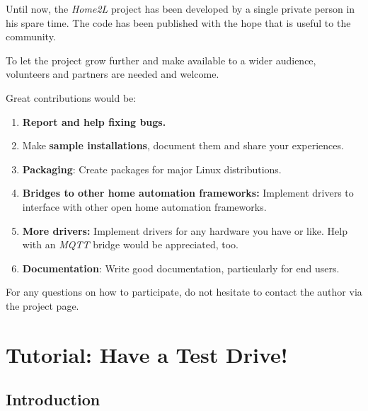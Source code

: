 \documentclass[12pt,english,parskip=half,headheight=19pt]{scrreprt}
\begin{document}
Until now, the \textit{Home2L} project has been developed by a single private person
in his spare time. The code has been published with the hope that is useful to
the community.

To let the project grow further and make available to a wider audience,
volunteers and partners are needed and welcome.

Great contributions would be:

\begin{enumerate}

  \item \textbf{Report and help fixing bugs.}

  \item Make \textbf{sample installations}, document them and share your experiences.

  \item \textbf{Packaging}: Create packages for major Linux distributions.

  \item \textbf{Bridges to other home automation frameworks:} Implement drivers to interface
    with other open home automation frameworks.

  \item \textbf{More drivers:} Implement drivers for any hardware you have or like.
    Help with an \textit{MQTT} bridge would be appreciated, too.

  \item \textbf{Documentation}: Write good documentation, particularly for end users.

\end{enumerate}

For any questions on how to participate, do not hesitate to contact the author
via the project page.





%
%
\chapter{Tutorial: Have a Test Drive!}
\label{ch:tutorial}
%
%




\section{Introduction}
\label{sec:tutorial-intro}
\end{document}
